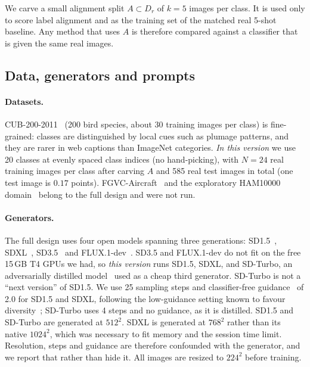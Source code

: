 \documentclass[10pt,twocolumn,letterpaper]{article}
\begin{document}
We carve a small alignment split $A \subset D_r$ of $k{=}5$ images per class. It is used only to score label alignment and as the training set of the matched real 5-shot baseline. Any method that uses $A$ is therefore compared against a classifier that is given the same real images.

\subsection{Data, generators and prompts}
\paragraph{Datasets.} CUB-200-2011~\cite{wah2011cub} (200 bird species, about 30 training images per class) is fine-grained: classes are distinguished by local cues such as plumage patterns, and they are rarer in web captions than ImageNet categories. \emph{In this version} we use 20 classes at evenly spaced class indices (no hand-picking), with $N{=}24$ real training images per class after carving $A$ and 585 real test images in total (one test image is $0.17$ points). FGVC-Aircraft~\cite{maji2013fine} and the exploratory HAM10000 domain~\cite{tschandl2018ham10000} belong to the full design and were not run.

\paragraph{Generators.} The full design uses four open models spanning three generations: SD1.5~\cite{rombach2022high}, SDXL~\cite{podell2024sdxl}, SD3.5~\cite{esser2024scaling,stability2024sd35} and FLUX.1-dev~\cite{bfl2024flux}. SD3.5 and FLUX.1-dev do not fit on the free 15\,GB T4 GPUs we had, so \emph{this version} runs SD1.5, SDXL, and SD-Turbo, an adversarially distilled model~\cite{sauer2024adversarial} used as a cheap third generator. SD-Turbo is not a ``next version'' of SD1.5. We use 25 sampling steps and classifier-free guidance~\cite{ho2022classifier} of 2.0 for SD1.5 and SDXL, following the low-guidance setting known to favour diversity~\cite{adamkiewicz2026pretty,sariyildiz2023fake}; SD-Turbo uses 4 steps and no guidance, as it is distilled. SD1.5 and SD-Turbo are generated at $512^2$. SDXL is generated at $768^2$ rather than its native $1024^2$, which was necessary to fit memory and the session time limit. Resolution, steps and guidance are therefore confounded with the generator, and we report that rather than hide it. All images are resized to $224^2$ before training.
\end{document}
